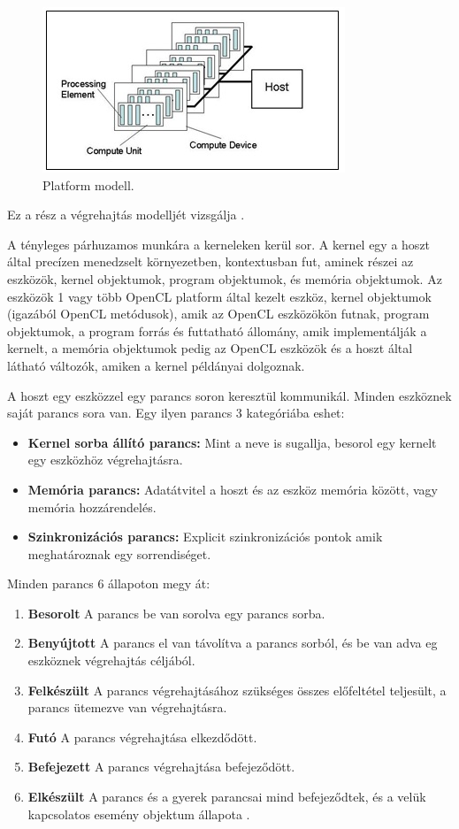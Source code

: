 \begin{figure}[h]
\centering
\includegraphics[scale=1.0]{images/platform_modell.jpg}
\caption{Platform modell. \cite{spec_platform}}
\label{fig:platform_modell}
\end{figure}

Ez a rész a végrehajtás modelljét vizsgálja \cite{spec_exec}.

A tényleges párhuzamos munkára a kerneleken kerül sor. A kernel egy a hoszt által precízen menedzselt környezetben, kontextusban fut, aminek részei az eszközök, kernel objektumok, program objektumok, és memória objektumok. Az eszközök 1 vagy több OpenCL platform által kezelt eszköz, kernel objektumok (igazából OpenCL metódusok), amik az OpenCL eszközökön futnak, program objektumok, a program forrás és futtatható állomány, amik implementálják a kernelt, a memória objektumok pedig az OpenCL eszközök és a hoszt által látható változók, amiken a kernel példányai dolgoznak.

A hoszt egy eszközzel egy parancs soron keresztül kommunikál. Minden eszköznek saját parancs sora van. Egy ilyen parancs 3 kategóriába eshet:
\begin{itemize}
\item\textbf{Kernel sorba állító parancs:} Mint a neve is sugallja, besorol egy kernelt egy eszközhöz végrehajtásra.
\item\textbf{Memória parancs:} Adatátvitel a hoszt és az eszköz memória között, vagy memória hozzárendelés.
\item\textbf{Szinkronizációs parancs:} Explicit szinkronizációs pontok amik meghatároznak egy sorrendiséget.
\end{itemize}
Minden parancs 6 állapoton megy át:
\begin{enumerate}
\item\textbf{Besorolt} A parancs be van sorolva egy parancs sorba.
\item\textbf{Benyújtott} A parancs el van távolítva a parancs sorból, és be van adva eg eszköznek végrehajtás céljából.
\item\textbf{Felkészült} A parancs végrehajtásához szükséges összes előfeltétel teljesült, a parancs ütemezve van végrehajtásra.
\item\textbf{Futó} A parancs végrehajtása elkezdődött.
\item\textbf{Befejezett} A parancs végrehajtása befejeződött.
\item\textbf{Elkészült} A parancs és a gyerek parancsai mind befejeződtek, és a velük kapcsolatos esemény objektum állapota .
\end{enumerate}

